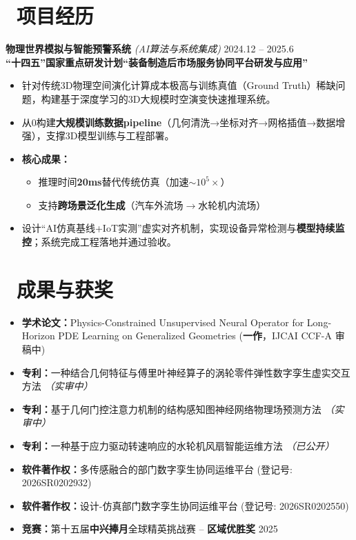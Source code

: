 \documentclass[11pt]{article}
\begin{document}
\section{\makebox[\widthof{\faBriefcase}][c]{\color{CVBlue}%
\faBriefcase}\ 项目经历}

\textbf{物理世界模拟与智能预警系统} 
\textit{(AI算法与系统集成)} \hfill 2024.12 -- 2025.6\\[0.2em]
\textcolor{CVBlue}{\textbf{``十四五''国家重点研发计划``装备制造后市场服务协同平台研发与应用''}}
\begin{itemize}
    \item 针对传统3D物理空间演化计算成本极高与训练真值（Ground Truth）稀缺问题，构建基于深度学习的3D大规模时空演变快速推理系统。
    \item 从0构建\textbf{大规模训练数据pipeline}（几何清洗→坐标对齐→网格插值→数据增强），支撑3D模型训练与工程部署。
    \item \textbf{核心成果：}
    \begin{itemize}
        \item 推理时间\textbf{20ms}替代传统仿真（加速$\sim10^5\times$）
        \item 支持\textbf{跨场景泛化生成}（汽车外流场$\rightarrow$水轮机内流场）
    \end{itemize}
    \item 设计``AI仿真基线+IoT实测''虚实对齐机制，实现设备异常检测与\textbf{模型持续监控}；系统完成工程落地并通过验收。
\end{itemize}



\section{%
    \makebox[\widthof{\faTrophy}][c]%
    {\color{CVBlue}\faTrophy}\ 成果与获奖%
}

\begin{itemize}
    \item \textbf{学术论文：}Physics-Constrained Unsupervised Neural Operator for Long-Horizon PDE Learning on Generalized Geometries (\textbf{一作}，IJCAI CCF-A 审稿中)
    \item \textbf{专利：}一种结合几何特征与傅里叶神经算子的涡轮零件弹性数字孪生虚实交互方法 \textit{（实审中）}
    \item \textbf{专利：}基于几何门控注意力机制的结构感知图神经网络物理场预测方法 \textit{（实审中）}
    \item \textbf{专利：}一种基于应力驱动转速响应的水轮机风扇智能运维方法 \textit{（已公开）}
    \item \textbf{软件著作权：}多传感融合的部门数字孪生协同运维平台 (登记号: 2026SR0202932)
    \item \textbf{软件著作权：}设计-仿真部门数字孪生协同运维平台 (登记号: 2026SR0202550)
    \item \textbf{竞赛：}第十五届\textbf{中兴捧月}全球精英挑战赛 -- \textbf{区域优胜奖} \hfill 2025
\end{itemize}
\end{document}
